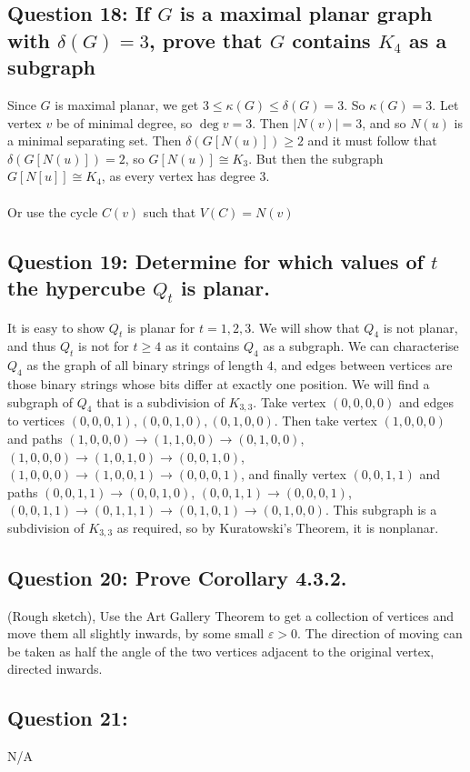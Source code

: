 \documentclass[letterpaper, 11pt]{article}
\newcommand{\1}{\mathds{1}}	%
\theoremstyle{definition}
\begin{document}
\subsection*{Question 18: If $G$ is a maximal planar graph with $\delta (G) = 3$, prove that $G$ contains $K_4$ as a subgraph}

Since $G$ is maximal planar, we get $3 \le \kappa (G) \le \delta (G) = 3$. So $\kappa (G) = 3$. Let vertex $v$ be of minimal degree, so $\deg v = 3$. Then $|N(v)| = 3$, and so $N(u)$ is a minimal separating set. Then $\delta (G[N(u)]) \ge 2$ and it must follow that $\delta (G[N(u)]) = 2$, so $G[N(u)] \cong K_3$. But then the subgraph $G[N[u]] \cong K_4$, as every vertex has degree $3$.
~\\~\\ Or use the cycle $C(v)$ such that $V(C) = N(v)$

\subsection*{Question 19: Determine for which values of $t$ the hypercube $Q_t$ is planar.}
It is easy to show $Q_t$ is planar for $t=1,2,3$. We will show that $Q_4$ is not planar, and thus $Q_t$ is not for $t \ge 4$ as it contains $Q_4$ as a subgraph. We can characterise $Q_4$ as the graph of all binary strings of length $4$, and edges between vertices are those binary strings whose bits differ at exactly one position. We will find a subgraph of $Q_4$ that is a subdivision of $K_{3,3}$. Take vertex $(0,0,0,0)$ and edges to vertices $(0,0,0,1), (0,0,1,0), (0,1,0,0)$. Then take vertex $(1,0,0,0)$ and paths $(1,0,0,0) \to (1,1,0,0) \to (0,1,0,0)$, $(1,0,0,0) \to (1,0,1,0) \to (0,0,1,0)$, $(1,0,0,0) \to (1,0,0,1) \to (0,0,0,1)$, and finally vertex $(0,0,1,1)$ and paths $(0,0,1,1) \to (0,0,1,0)$, $(0,0,1,1) \to (0,0,0,1)$, $(0,0,1,1) \to (0,1,1,1) \to (0,1,0,1) \to (0,1,0,0)$. This subgraph is a subdivision of $K_{3,3}$ as required, so by Kuratowski's Theorem, it is nonplanar.

\subsection*{Question 20: Prove Corollary 4.3.2.}
(Rough sketch), Use the Art Gallery Theorem to get a collection of vertices and move them all slightly inwards, by some small $\varepsilon > 0$. The direction of moving can be taken as half the angle of the two vertices adjacent to the original vertex, directed inwards.

\subsection*{Question 21:}
N/A
\end{document}
